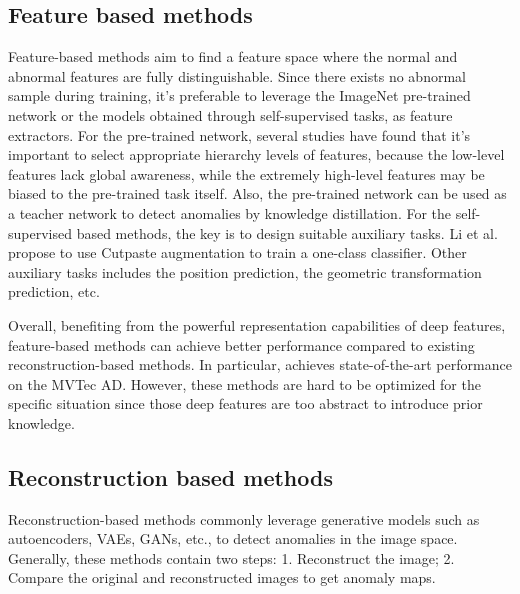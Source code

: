 \documentclass[5p, twocolumn]{elsarticle}[draft]
\begin{document}
\subsection{Feature based methods}
\label{2.1}
Feature-based methods aim to find a feature space where the normal and abnormal features are fully distinguishable. Since there exists no abnormal sample during training, it's preferable to leverage the ImageNet pre-trained network\cite{bergmann2020uninformed, roth2021towards,yu2021fastflow,defard2021padim,zheng2021focus,rippel2021modeling,shi2021unsupervised} or the models obtained through self-supervised tasks\cite{li2021cutpaste,yi2020patch,sohn2020learning}, as feature extractors. For the pre-trained network, several studies\cite{roth2021towards,shi2021unsupervised} have found that it's important to select appropriate hierarchy levels of features, because the low-level features lack global awareness, while the extremely high-level features may be biased to the pre-trained task itself. Also, the pre-trained network can be used as a teacher network to detect anomalies by knowledge distillation\cite{bergmann2020uninformed}. For the self-supervised based methods, the key is to design suitable auxiliary tasks. Li et al.\cite{li2021cutpaste} propose to use Cutpaste augmentation to train a one-class classifier. Other auxiliary tasks includes the position prediction\cite{yi2020patch}, the geometric transformation prediction\cite{sohn2020learning}, etc.  

Overall, benefiting from the powerful representation capabilities of deep features, feature-based methods can achieve better performance compared to existing reconstruction-based methods. In particular, \cite{roth2021towards} achieves state-of-the-art performance on the MVTec AD. However, these methods are hard to be optimized for the specific situation since those deep features are too abstract to introduce prior knowledge.

\subsection{Reconstruction based methods}
\label{2.2}
Reconstruction-based methods commonly leverage generative models such as autoencoders\cite{bergmann2018improving,collin2021improved,zavrtanik2021reconstruction}, VAEs\cite{venkataramanan2020attention}, GANs\cite{schlegl2019f,liang2022omni}, etc., to detect anomalies in the image space. Generally, these methods contain two steps: 1. Reconstruct the image; 2. Compare the original and reconstructed images to get anomaly maps. 
\end{document}
